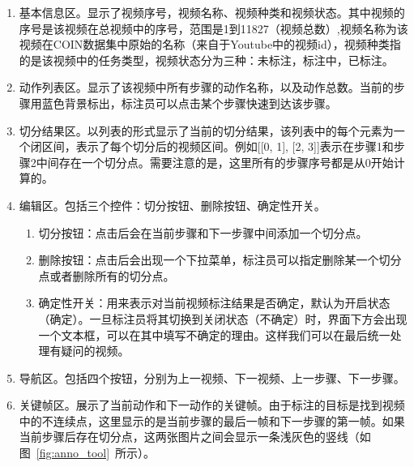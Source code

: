 \begin{enumerate}
    \item 基本信息区。显示了视频序号，视频名称、视频种类和视频状态。其中视频的序号是该视频在总视频中的序号，范围是1到11827（视频总数）,视频名称为该视频在COIN数据集中原始的名称（来自于Youtube中的视频id），视频种类指的是该视频中的任务类型，视频状态分为三种：未标注，标注中，已标注。
    \item 动作列表区。显示了该视频中所有步骤的动作名称，以及动作总数。当前的步骤用蓝色背景标出，标注员可以点击某个步骤快速到达该步骤。
    \item 切分结果区。以列表的形式显示了当前的切分结果，该列表中的每个元素为一个闭区间，表示了每个切分后的视频区间。例如[[0, 1], [2, 3]]表示在步骤1和步骤2中间存在一个切分点。需要注意的是，这里所有的步骤序号都是从0开始计算的。
    \item 编辑区。包括三个控件：切分按钮、删除按钮、确定性开关。
    \begin{enumerate}
        \item 切分按钮：点击后会在当前步骤和下一步骤中间添加一个切分点。
        \item 删除按钮：点击后会出现一个下拉菜单，标注员可以指定删除某一个切分点或者删除所有的切分点。
        \item 确定性开关：用来表示对当前视频标注结果是否确定，默认为开启状态（确定）。一旦标注员将其切换到关闭状态（不确定）时，界面下方会出现一个文本框，可以在其中填写不确定的理由。这样我们可以在最后统一处理有疑问的视频。
    \end{enumerate}
    \item 导航区。包括四个按钮，分别为上一视频、下一视频、上一步骤、下一步骤。
    \item 关键帧区。展示了当前动作和下一动作的关键帧。由于标注的目标是找到视频中的不连续点，这里显示的是当前步骤的最后一帧和下一步骤的第一帧。如果当前步骤后存在切分点，这两张图片之间会显示一条浅灰色的竖线（如图~\ref{fig:anno_tool}~所示）。
    
\end{enumerate}


